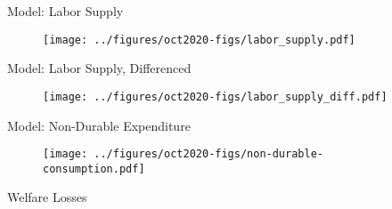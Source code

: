 \documentclass[9pt,pdftex,aspectratio=1610]{beamer}
\theoremstyle{definition}
\begin{document}
\begin{frame}[t]{Model: Labor Supply}
\begin{figure}[t]
\centerline{\texttt{[image: ../figures/oct2020-figs/labor\_supply.pdf]}}
\end{figure}
\end{frame}

\begin{frame}[t]{Model: Labor Supply, Differenced}
\begin{figure}[t]
\centerline{\texttt{[image: ../figures/oct2020-figs/labor\_supply\_diff.pdf]}}
\end{figure}
\end{frame}


\begin{frame}[t]{Model: Non-Durable Expenditure}
\begin{figure}[t]
\centerline{\texttt{[image: ../figures/oct2020-figs/non-durable-consumption.pdf]}}
\end{figure}
\end{frame}




\begin{frame}[t]{Welfare Losses}
\begin{figure}
    \centering
\end{figure}
\end{frame}

\end{document}
